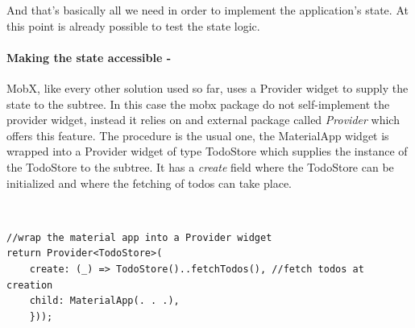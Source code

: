 And that’s basically all we need in order to implement the application’s state. At this point is already possible to test the state logic.

\paragraph{Making the state accessible - }
\label{subpar:todo_app_bloc_core_state} MobX, like every other solution used so far, uses a Provider widget to supply the state to the subtree. In this case the mobx package do not self-implement the provider widget, instead it relies on and external package called \textit{Provider} which offers this feature. The procedure is the usual one, the MaterialApp widget is wrapped into a Provider widget of type TodoStore which supplies the instance of the TodoStore to the subtree. It has a \textit{create} field where the TodoStore can be initialized and where the fetching of todos can take place.
\begin{code}
\mbox{}\\
 \mbox{}
		\label{code:2.14}
\begin{verbatim}
//wrap the material app into a Provider widget
return Provider<TodoStore>(
    create: (_) => TodoStore()..fetchTodos(), //fetch todos at creation
    child: MaterialApp(. . .),
    }));
\end{verbatim}
\mbox{}
\end{code}



